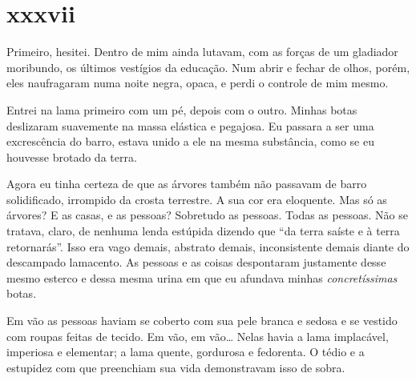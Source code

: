 \section{xxxvii} 

 


Primeiro, hesitei. Dentro de mim ainda lutavam, com as forças de um gladiador
moribundo, os últimos vestígios da educação. Num abrir e fechar de olhos,
porém, eles naufragaram numa noite negra, opaca, e perdi o controle de mim
mesmo.

Entrei na lama primeiro com um pé, depois com o outro. Minhas botas deslizaram
suavemente na massa elástica e pegajosa. Eu passara a ser uma excrescência do
barro, estava unido a ele na mesma substância, como se eu houvesse brotado da
terra.

Agora eu tinha certeza de que as árvores também não passavam de barro
solidificado, irrompido da crosta terrestre. A sua cor era eloquente. Mas só
as árvores? E as casas, e as pessoas? Sobretudo as pessoas. Todas as pessoas.
Não se tratava, claro, de nenhuma lenda estúpida dizendo que ``da terra
saíste e à terra retornarás''. Isso era vago demais, abstrato demais,
inconsistente demais diante do descampado lamacento. As pessoas e as coisas
despontaram justamente desse mesmo esterco e dessa mesma urina em que eu
afundava minhas \textit{concretíssimas} botas.

Em vão as pessoas haviam se coberto com sua pele branca e sedosa e se vestido
com roupas feitas de tecido. Em vão, em vão\ldots{} Nelas havia a lama
implacável, imperiosa e elementar; a lama quente, gordurosa e fedorenta. O
tédio e a estupidez com que preenchiam sua vida demonstravam isso de sobra.


